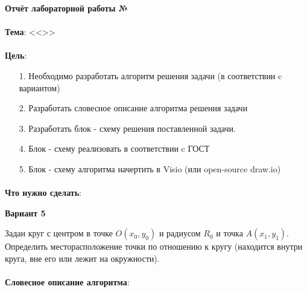 \documentclass[12pt, a4paper, simple]{eskdtext}
\def \gpiDocTopic {Отчёт лабораторной работы №\gpiDocNum}
\begin{document}



\begin{center}
    \textbf{\gpiDocTopic}
\end{center}

\paragraph{} \textbf{Тема}: <<\gpiTopicRep>>

\paragraph{} \textbf{Цель}:
\begin{enumerate}
    \item[1.] Необходимо разработать алгоритм решения задачи (в соответствии c вариантом)
    \item[2.] Разработать словесное описание алгоритма решения задачи
    \item[3.] Разработать блок - схему решения поставленной задачи.
    \item[4.] Блок - схему реализовать в соответствии c ГОСТ
    \item[5.] Блок - схему алгоритма начертить в Visio (или open-source draw.io)
\end{enumerate}

\paragraph{} \textbf{Что нужно сделать}:

\begin{center}
    \textbf{Вариант 5}
\end{center}

Задан круг с центром в точке $O(x_0, y_0)$ и радиусом $R_0$ и точка $A(x_1, y_1)$.
Определить месторасположение точки по отношению к кругу
(находится внутри круга, вне его или лежит на окружности).

\paragraph{} \textbf{Словесное описание алгоритма}:
\end{document}
